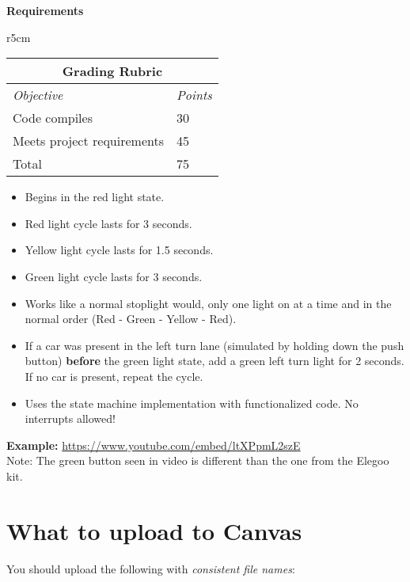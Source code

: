 \documentclass[10pt]{article}
\begin{document}
\noindent\textbf{Requirements}
\begin{wraptable}{r}{5cm}
	\footnotesize
	\centering
	\begin{tabular}{@{}ll@{}}
		\multicolumn{2}{c}{\textbf{Grading Rubric}} \\ \midrule 
		\multicolumn{1}{l}{\textit{Objective}}   & \textit{Points}   \\ \midrule 
		Code compiles                    & 30       \\ \midrule
		Meets project requirements            & 45       \\ \midrule
		Total                            & 75       \\ \bottomrule
	\end{tabular}
\end{wraptable}
\begin{itemize}
	\item Begins in the red light state.
	\item Red light cycle lasts for 3 seconds.
	\item Yellow light cycle lasts for 1.5 seconds.
	\item Green light cycle lasts for 3 seconds.
	\item Works like a normal stoplight would, only one light on at a time and in the
	normal order (Red - Green - Yellow - Red).
	\item If a car was present in the left turn lane (simulated by holding down the push
	button) \textbf{before} the green light state, add a green left turn light for 2
	seconds. If no car is present, repeat the cycle.
	\item Uses the state machine implementation with functionalized code. No interrupts allowed!
\end{itemize}

\textbf{Example: } \url{https://www.youtube.com/embed/ltXPpmL2szE}\\ 
Note: The green button seen in video is different than the one from the Elegoo kit. 


\section*{What to upload to Canvas}
You should upload the following with \textit{consistent file names}:
\end{document}
